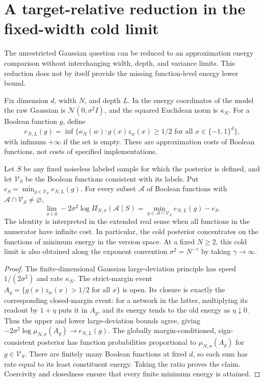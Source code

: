 \section{A target-relative reduction in the fixed-width cold limit}
\label{sec:cold-limit-reduction}

The unrestricted Gaussian question can be reduced to an approximation
energy comparison without interchanging width, depth, and variance limits.
This reduction does not by itself provide the missing function-level
energy lower bound.

Fix dimension $d$, width $N$, and depth $L$. In the energy coordinates of
the model the raw Gaussian is $\mathcal N(0,\sigma^2 I)$, and the squared
Euclidean norm is $\kappa_N$. For a Boolean function $g$, define
\[
 e_{N,L}(g)=\inf\{\kappa_N(w):g(x)z_w(x)\ge1/2
                           \text{ for all }x\in\{-1,1\}^d\},
\]
with infimum $+\infty$ if the set is empty.
These are approximation costs of Boolean functions, not costs of specified
implementations.

\begin{proposition}
\label{prop:cold-posterior-rates}
Let $S$ be any fixed noiseless labeled sample for which the posterior is
defined, and let $\mathcal V_S$ be the Boolean functions consistent with
its labels. Put $e_S=\min_{g\in\mathcal V_S}e_{N,L}(g)$.
For every subset $\mathcal A$ of Boolean functions with
$\mathcal A\cap\mathcal V_S\ne\varnothing$,
\[
 \lim_{\sigma\downarrow0}-2\sigma^2\log\Pi_{N,\sigma}
               (\mathcal A\mid S)
 =\min_{g\in\mathcal A\cap\mathcal V_S}e_{N,L}(g)-e_S.
\]
The identity is interpreted in the extended real sense when all functions
in the numerator have infinite cost. In particular, the cold posterior
concentrates on the functions of minimum energy in the version space.
At a fixed $N\ge2$, this cold limit is also obtained along the exponent
convention $\sigma^2=N^{-\gamma}$ by taking $\gamma\to\infty$.
\end{proposition}

\begin{proof}
The finite-dimensional Gaussian large-deviation principle has speed
$1/(2\sigma^2)$ and rate $\kappa_N$. The strict-margin event
$A_g=\{g(x)z_w(x)>1/2\text{ for all }x\}$ is open. Its closure is
exactly the corresponding closed-margin event: for a network in the
latter, multiplying its readout by $1+\eta$ puts it in $A_g$, and its
energy tends to the old energy as $\eta\downarrow0$.
Thus the upper and lower large-deviation bounds agree, giving
$-2\sigma^2\log\mu_{N,\sigma}(A_g)\to e_{N,L}(g)$.
The globally margin-conditioned, sign-consistent posterior has function
probabilities proportional to $\mu_{N,\sigma}(A_g)$ for
$g\in\mathcal V_S$. There are finitely many Boolean functions at fixed
$d$, so each sum has rate equal to its least constituent energy. Taking
the ratio proves the claim. Coercivity and closedness ensure that every
finite minimum energy is attained.
\end{proof}

